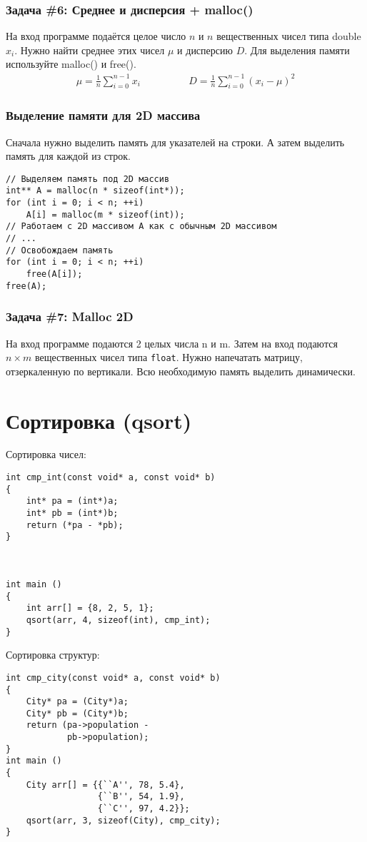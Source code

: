 \documentclass{article}
\begin{document}
\subsubsection*{\Squarepipe \quad Задача \#6: Среднее и дисперсия + malloc()}
На вход программе подаётся целое число $n$ и $n$ вещественных чисел типа double ${x_i}$. Нужно найти среднее этих чисел $\mu$ и дисперсию $D$. Для выделения памяти используйте malloc() и free(). 
\begin{align*}
  \mu = \frac{1}{n}\sum_{i=0}^{n-1}x_i & \quad \quad \quad \quad D = \frac{1}{n}\sum_{i=0}^{n-1}(x_i - \mu)^2
\end{align*}

\subsubsection*{Выделение памяти для 2D массива}
Сначала нужно выделить память для указателей на строки. А затем выделить память для каждой из строк.
\begin{lstlisting}
// Выделяем память под 2D массив
int** A = malloc(n * sizeof(int*));
for (int i = 0; i < n; ++i)
	A[i] = malloc(m * sizeof(int));
// Работаем с 2D массивом A как с обычным 2D массивом
// ...  
// Освобождаем память
for (int i = 0; i < n; ++i)
	free(A[i]);
free(A);
\end{lstlisting}

\subsubsection*{\Squarepipe \quad Задача \#7: Malloc 2D}
На вход программе подаются 2 целых числа n и m. Затем на вход подаются $n \times m$ вещественных чисел типа \texttt{float}. Нужно напечатать матрицу, отзеркаленную по вертикали. Всю необходимую память выделить динамически.
\section*{Сортировка (qsort)}
\begin{multicols}{2}
Сортировка чисел:
\begin{lstlisting}
int cmp_int(const void* a, const void* b)
{
    int* pa = (int*)a;
    int* pb = (int*)b;
    return (*pa - *pb);
}



int main ()
{
    int arr[] = {8, 2, 5, 1};
    qsort(arr, 4, sizeof(int), cmp_int);
}
\end{lstlisting}
Сортировка структур:
\begin{lstlisting}
int cmp_city(const void* a, const void* b)
{
    City* pa = (City*)a;
    City* pb = (City*)b;
    return (pa->population -
            pb->population);
}
int main ()
{
    City arr[] = {{``A'', 78, 5.4}, 
                  {``B'', 54, 1.9}, 
                  {``C'', 97, 4.2}};
    qsort(arr, 3, sizeof(City), cmp_city);
}
\end{lstlisting}
\end{multicols}
\end{document}
